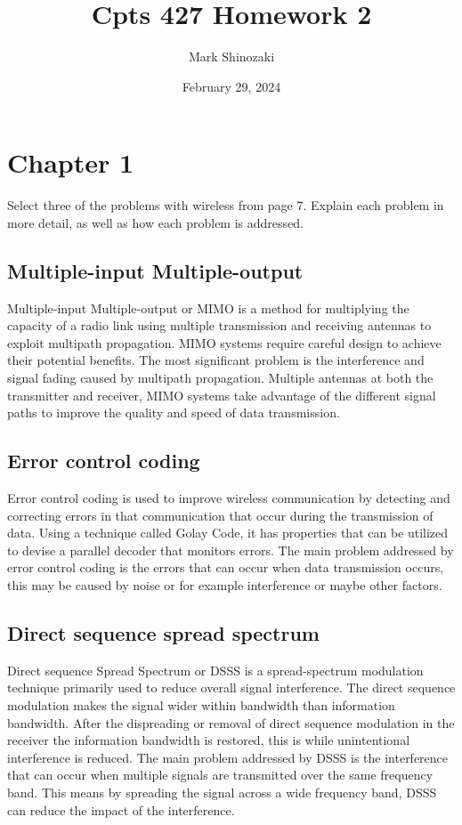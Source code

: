 \documentclass{article}
\begin{document}
\title{Cpts 427 Homework 2}
\author{Mark Shinozaki}
\date{February 29, 2024}
\maketitle

\section{Chapter 1}
Select three of the problems with wireless from page 7. Explain each problem in more detail, as well as how each problem is addressed.

\subsection{Multiple-input Multiple-output}
Multiple-input Multiple-output or MIMO is a method for multiplying the capacity of a radio link using multiple transmission and receiving antennas to exploit multipath propagation. MIMO systems require careful design to achieve their potential benefits. The most significant problem is the interference and signal fading caused by multipath propagation. Multiple antennas at both the transmitter and receiver, MIMO systems take advantage of the different signal paths to improve the quality and speed of data transmission.

\subsection{Error control coding}
Error control coding is used to improve wireless communication by detecting and correcting errors in that communication that occur during the transmission of data. Using a technique called Golay Code, it has properties that can be utilized to devise a parallel decoder that monitors errors. The main problem addressed by error control coding is the errors that can occur when data transmission occurs, this may be caused by noise or for example interference or maybe other factors.

\subsection{Direct sequence spread spectrum}
Direct sequence Spread Spectrum or DSSS is a spread-spectrum modulation technique primarily used to reduce overall signal interference. The direct sequence modulation makes the signal wider within bandwidth than information bandwidth. After the dispreading or removal of direct sequence modulation in the receiver the information bandwidth is restored, this is while unintentional interference is reduced. The main problem addressed by DSSS is the interference that can occur when multiple signals are transmitted over the same frequency band. This means by spreading the signal across a wide frequency band, DSSS can reduce the impact of the interference.
\end{document}
